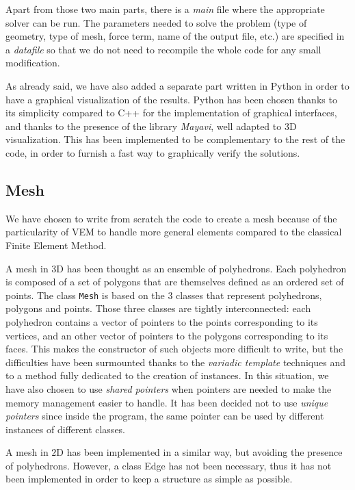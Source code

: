 Apart from those two main parts, there is a \textit{main} file where the appropriate solver can be run. The parameters needed to solve the problem (type of geometry, type of mesh, force term, name of the output file, etc.) are specified in a \textit{datafile} so that we do not need to recompile the whole code for any small modification. 

As already said, we have also added a separate part written in Python in order to have a graphical visualization of the results. Python has been chosen thanks to its simplicity compared to C++ for the implementation of graphical interfaces, and thanks to the presence of the library \textit{Mayavi}, well adapted to $3$D visualization. This has been implemented to be complementary to the rest of the code, in order to furnish a fast way to graphically verify  the solutions. 

\subsection{Mesh}
We have chosen to write from scratch the code to create a mesh because of the particularity of VEM to handle more general elements compared to the classical Finite Element Method. 

A mesh in $3$D has been thought as an ensemble of polyhedrons. Each polyhedron is composed of a set of polygons that are themselves defined as an ordered set of points. The class \verb|Mesh| is based on the $3$ classes that represent polyhedrons, polygons and points. Those three classes are tightly interconnected: each polyhedron contains a vector of pointers to the points corresponding to its vertices, and an other vector of pointers to the polygons corresponding to its faces. This makes the constructor of such objects more difficult to write, but the difficulties have been surmounted thanks to the \textit{variadic template} techniques and to a method fully dedicated to the creation of instances. In this situation, we have also chosen to use \textit{shared pointers} when pointers are needed to make the memory management easier to handle. It has been decided not to use \textit{unique pointers} since inside the program, the same pointer can be used by different instances of different classes. 

A mesh in $2$D has been implemented in a similar way, but avoiding the presence of polyhedrons. However, a class Edge has not been necessary, thus it has not been implemented in order to keep a structure as simple as possible. 

